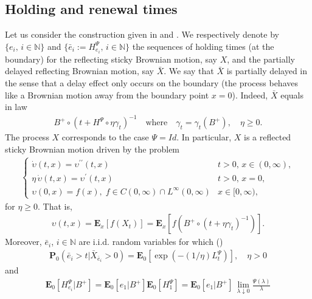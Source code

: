 \documentclass[11pt,a4paper]{article}
\theoremstyle{plain}
\theoremstyle{definition}
\theoremstyle{remark}
\begin{document}
		\subsection{Holding and renewal times}
		\label{sec:HTandRT}
		Let us consider the construction given in \cite{d2022fractionalsticky} and \cite{d2024fractionalsticky}. We respectively denote by $\{e_i,\, i \in \mathbb{N}\}$ and $\{\bar{e}_i := H^\Psi_{e_i},\, i \in \mathbb{N}\}$ the sequences of holding times (at the boundary) for the reflecting sticky Brownian motion, say $X$, and the partially delayed reflecting Brownian motion, say $\bar{X}$. We say that $\bar{X}$ is partially delayed in the sense that a delay effect only occurs on the boundary (the process behaves like a Brownian motion away from the boundary point $x=0$). Indeed,  $\bar{X}$ equals in law
		\begin{align*}
			B^+ \circ (t + H^\Psi \circ \eta \gamma_t)^{-1} \quad \textrm{where} \quad \gamma_t = \gamma_t(B^+), \quad \eta \geq 0.
		\end{align*} 
		The process $X$ corresponds to the case  $\Psi=Id$. In particular, $X$ is a reflected sticky Brownian motion driven by the problem
		\begin{align*}
			\begin{cases}
				\displaystyle \dot{\upsilon}(t,x)= \upsilon^{\prime \prime}(t,x) & t>0,\, x \in (0,\infty), \\
				\displaystyle \eta\, \dot{\upsilon}(t,x) = \upsilon^\prime(t,x) & t>0,\, x=0,\\
				\displaystyle \upsilon(0,x)=f(x), \; f \in C(0, \infty) \cap L^\infty(0, \infty) & x \in [0, \infty),
			\end{cases}
		\end{align*}
		for $\eta \geq 0$. That is,
		\begin{align*}
			\upsilon(t,x) = \mathbf{E}_x\left[f(X_t)\right] = \mathbf{E}_x\left[f(B^+ \circ (t + \eta \gamma_t)^{-1})\right].
		\end{align*}
		Moreover, $\bar{e}_i$, $i \in \mathbb{N}$ are i.i.d. random variables for which (\cite[Section 4.3]{d2022fractionalsticky})
		\begin{align*}
			\mathbf{P}_0(\bar{e}_i >t | \bar{X}_{\bar{e}_i}>0) = \mathbf{E}_0\left[\exp\left(-(1/\eta) L^\Psi_t \right)\right], \quad \eta>0
		\end{align*}
		and
		\begin{align}
			\mathbf{E}_0[H^\Psi_{e_i}|B^+] = \mathbf{E}_0[e_1|B^+] \mathbf{E}_0[H^\Psi_1] = \mathbf{E}_0[e_1|B^+]\, \lim_{\lambda \downarrow 0} \frac{\Psi(\lambda)}{\lambda}
			\label{meanHoldingTime}
		\end{align}   
\end{document}
